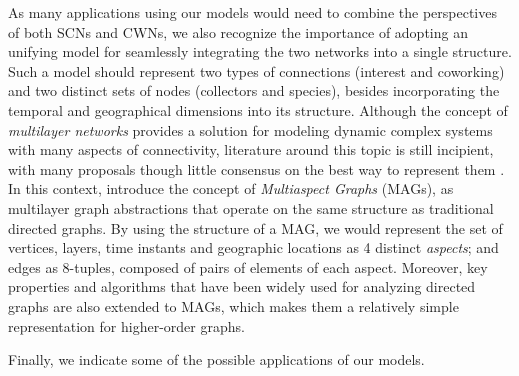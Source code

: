 As many applications using our models would need to combine the perspectives of both SCNs and CWNs, we also recognize the importance of adopting an unifying model for seamlessly integrating the two networks into a single structure.
Such a model should represent two types of connections (interest and coworking) and two distinct sets of nodes (collectors and species), besides incorporating the temporal and geographical dimensions into its structure.
Although the concept of \textit{multilayer networks} provides a solution for modeling dynamic complex systems with many aspects of connectivity, literature around this topic is still incipient, with many proposals though little consensus on the best way to represent them \cite{Kivela2014}.
In this context,  introduce the concept of \textit{Multiaspect Graphs} (MAGs), as multilayer graph abstractions that operate on the same structure as traditional directed graphs.
By using the structure of a MAG, we would represent the set of vertices, layers, time instants and geographic locations as 4 distinct \textit{aspects}; and edges as $8$-tuples, composed of pairs of elements of each aspect.
Moreover, key properties and algorithms that have been widely used for analyzing directed graphs are also extended to MAGs, which makes them a relatively simple representation for higher-order graphs.



Finally, we indicate some of the possible applications of our models.


